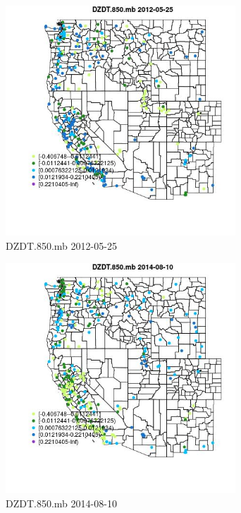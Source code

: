 \begin{figure} 
\centering  
\includegraphics[width=0.77\textwidth]{Code_Outputs/Report_ML_input_PM25_Step4_part_e_de_duplicated_aves_compiled_2019-05-18wNAs_MapObsDZDT850mb2012-05-25.jpg} 
\caption{\label{fig:Report_ML_input_PM25_Step4_part_e_de_duplicated_aves_compiled_2019-05-18wNAsMapObsDZDT850mb2012-05-25}DZDT.850.mb 2012-05-25} 
\end{figure} 
 

\begin{figure} 
\centering  
\includegraphics[width=0.77\textwidth]{Code_Outputs/Report_ML_input_PM25_Step4_part_e_de_duplicated_aves_compiled_2019-05-18wNAs_MapObsDZDT850mb2014-08-10.jpg} 
\caption{\label{fig:Report_ML_input_PM25_Step4_part_e_de_duplicated_aves_compiled_2019-05-18wNAsMapObsDZDT850mb2014-08-10}DZDT.850.mb 2014-08-10} 
\end{figure} 
 

